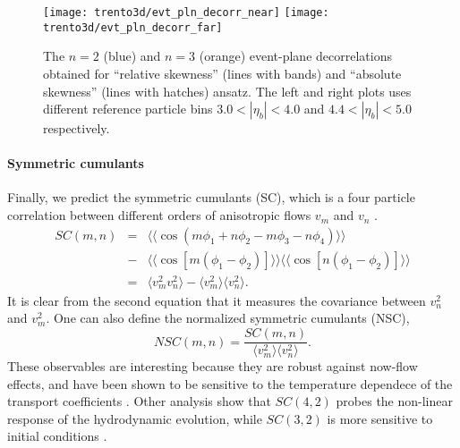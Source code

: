 \begin{figure}
\centering
\texttt{[image: trento3d/evt\_pln\_decorr\_near]}
\hfill
\texttt{[image: trento3d/evt\_pln\_decorr\_far]}
\caption{The $n=2$ (blue) and $n=3$ (orange) event-plane decorrelations obtained for ``relative skewness'' (lines with bands) and ``absolute skewness'' (lines with hatches) ansatz. The left and right plots uses different reference particle bins $3.0<|\eta_b|<4.0$ and $4.4<|\eta_b|<5.0$ respectively.}
\label{fig:trento:epd}
\end{figure}

\paragraph{Symmetric cumulants} Finally, we predict the symmetric cumulants (SC), which is a four particle correlation between different orders of anisotropic flows $v_m$ and $v_n$ \cite{Niemi:2012aj,Bilandzic:2013kga}.
\begin{eqnarray}
SC(m, n) &=& \langle\langle \cos(m\phi_1+n\phi_2-m\phi_3-n\phi_4)\rangle\rangle \nonumber \\
\nonumber &-& \langle\langle\cos[m(\phi_1-\phi_2)]\rangle\rangle\langle\langle\cos[n(\phi_1-\phi_2)]\rangle\rangle \label{eq:scmn}\\
&=& \langle v_m^2 v_n^2 \rangle - \langle v_m^2\rangle\langle v_n^2\rangle.
\end{eqnarray}
It is clear from the second equation that it measures the covariance between $v_n^2$ and $v_m^2$.
One can also define the normalized symmetric cumulants (NSC),
\begin{equation}
NSC(m,n) = \frac{SC(m,n)}{\langle v_m^2\rangle\langle v_n^2\rangle}.
\end{equation}
These observables are interesting because they are robust against now-flow effects, and have been shown to be sensitive to the temperature dependece of the transport coefficients \cite{ALICE:2016kpq}.
Other analysis show that $SC(4,2)$ probes the non-linear response of the hydrodynamic evolution, while $SC(3,2)$ is more sensitive to initial conditions \cite{Zhu:2016puf}.



